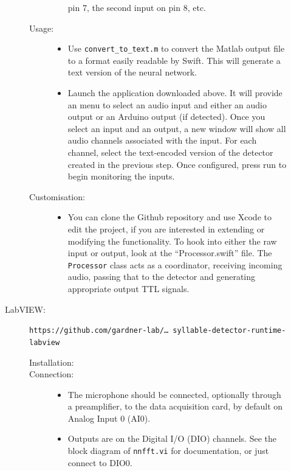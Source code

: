 \documentclass[10pt,letterpaper]{article}
\begin{document}
\begin{description}
\begin{description}
\begin{description}
\begin{itemize}
      pin 7, the second input on pin 8, etc.
      \end{itemize}
    \item[Usage:]\hfill
      \begin{itemize}
      \item Use {\tt convert\_to\_text.m} to convert the Matlab output file to a format 
      easily readable by Swift. This will generate a text version of the neural network.
      \item Launch the application downloaded above. It will provide an 
      menu to select an audio input and either an audio output or an Arduino output (if 
      detected). Once you select an input and an output, a new window will show all audio 
      channels associated with the input. For each channel, select the text-encoded version of 
      the detector created in the previous step. Once configured, press run to begin 
      monitoring the inputs.
      \end{itemize}
    \item[Customisation:]\hfill
      \begin{itemize}
      \item You can clone the Github repository and use Xcode to edit the project, if you 
      are interested in extending or modifying the functionality. To hook into either 
      the raw input or output, look at the ``Processor.swift'' file. The 
      {\tt Processor} class acts as a coordinator, receiving incoming audio, passing that
      to the detector and generating appropriate output TTL signals.
      \end{itemize}
    \end{description}
  \item[LabVIEW:] {\tt https://github.com/gardner-lab/\dots\ syllable-detector-runtime-labview}
    \begin{description}
    \item[Installation:]\hfill
    \item[Connection:]\hfill
      \begin{itemize}
      \item The microphone should be connected, optionally through a preamplifier, to the data acquisition card, by default on Analog Input 0 (AI0).
      \item Outputs are on the Digital I/O (DIO) channels.  See the block diagram of {\tt nnfft.vi} for documentation, or just connect to DIO0.

\end{itemize}
\end{description}
\end{description}
\end{description}
\end{document}
